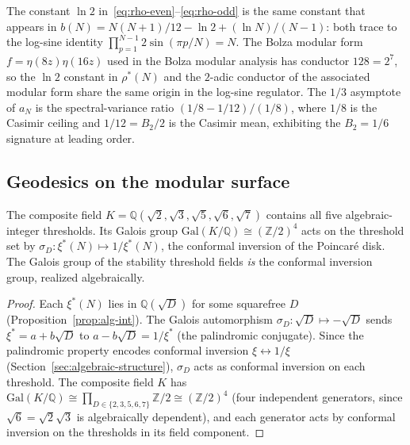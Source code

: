 \begin{remark}
\label{rmk:log2-bolza}
The constant $\ln 2$ in~\eqref{eq:rho-even}--\eqref{eq:rho-odd}
is the same constant that appears in
$b(N) = N(N{+}1)/12 - \ln 2 + (\ln N)/(N{-}1)$:
both trace to the log-sine identity
$\prod_{p=1}^{N-1} 2\sin(\pi p/N) = N$.
The Bolza modular form $f = \eta(8z)\eta(16z)$ used in the
Bolza modular analysis has conductor $128 = 2^7$, so the
$\ln 2$ constant in $\rho^*(N)$ and the $2$-adic conductor
of the associated modular form share the same origin in the
log-sine regulator. The $1/3$ asymptote of $a_N$ is the
spectral-variance ratio
$(1/8 - 1/12)/(1/8)$, where $1/8$ is the Casimir ceiling
and $1/12 = B_2/2$ is the Casimir mean, exhibiting the
$B_2 = 1/6$ signature at leading order.
\end{remark}

\subsection{Geodesics on the modular surface}
\label{sec:geodesics-on-modular}

\begin{proposition}
\label{prop:galois-inversion}
The composite field
$K = \mathbb{Q}(\sqrt{2}, \sqrt{3}, \sqrt{5}, \sqrt{6}, \sqrt{7})$
contains all five algebraic-integer thresholds.  Its Galois group
$\mathrm{Gal}(K/\mathbb{Q}) \cong (\mathbb{Z}/2)^4$ acts on the
threshold set by
$\sigma_D\colon \xi^*(N) \mapsto 1/\xi^*(N)$, the conformal inversion of the Poincar\'e disk.
The Galois group of the stability threshold fields \emph{is} the
conformal inversion group, realized algebraically.
\end{proposition}

\begin{proof}
Each $\xi^*(N)$ lies in $\mathbb{Q}(\sqrt{D})$ for some squarefree
$D$ (Proposition~\ref{prop:alg-int}).  The Galois automorphism
$\sigma_D\colon \sqrt{D} \mapsto -\sqrt{D}$ sends $\xi^* = a + b\sqrt{D}$
to $a - b\sqrt{D} = 1/\xi^*$ (the palindromic conjugate).
Since the palindromic property encodes conformal inversion
$\xi \leftrightarrow 1/\xi$ (Section~\ref{sec:algebraic-structure}),
$\sigma_D$ acts as conformal inversion on each threshold.
The composite field $K$ has
$\mathrm{Gal}(K/\mathbb{Q}) \cong \prod_{D \in \{2,3,5,6,7\}}
\mathbb{Z}/2 \cong (\mathbb{Z}/2)^4$
(four independent generators, since $\sqrt{6} = \sqrt{2}\sqrt{3}$
is algebraically dependent), and each generator acts by conformal
inversion on the thresholds in its field component.
\end{proof}

